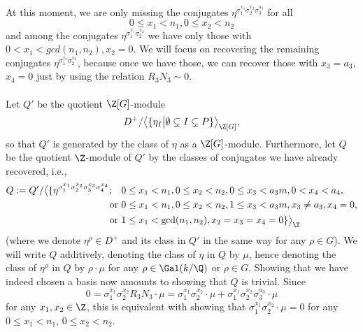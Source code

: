 \paragraph*{}
At this moment, we are only missing the conjugates $\eta^{\sigma_1^{x_1}\sigma_2^{x_2}\sigma_3^{a_3}}$ for all $$0\leq x_1<n_1, 0\leq x_2<n_2$$ 
and among the conjugates $\eta^{\sigma_1^{x_1}\sigma_2^{x_2}}$
we have only those with 
$0 < x_1 <gcd(n_1,n_2),  x_2 = 0$.
We will focus on recovering the remaining conjugates $\eta^{\sigma_1^{x_1}\sigma_2^{x_2}}$, 
because once we have those, we can recover those with $x_3=a_3$, $x_4=0$ just by using the relation $R_3N_3\sim 0$.

\paragraph*{}
Let $Q'$ be the quotient $\Z[G]$-module $$D^+/\big\langle \{\eta_I \big\vert \emptyset \subsetneq I \subsetneq P \}\big\rangle_{\Z[G]},$$
so that $Q'$ is generated by the class of $\eta$ as a $\Z[G]$-module. Furthermore, let $Q$ be the quotient $\Z$-module of $Q'$ by the classes of conjugates we have already recovered, i.e., %
\begin{align*}
Q:=Q'/\big\langle \{\eta^{\sigma_1^{x_1}\sigma_2^{x_2}\sigma_3^{x_3}\sigma_4^{x_4}}; \quad & 0\leq x_1< n_1, 0\leq x_2<n_2, 0\leq x_3<a_3m,0< x_4<a_4,\\
\text { or }& 0\leq x_1< n_1, 0\leq x_2<n_2, 1\leq x_3<a_3m, x_3\neq a_3, x_4=0,\\
\text { or }& 1\leq x_1<\gcd(n_1,n_2), x_2=x_3=x_4=0 \}\big\rangle_{\Z}
\end{align*}
(where we denote $\eta^{\rho}\in D^+$ and its class in $Q'$ in the same way for any $\rho\in G$).
We will write $Q$ additively, denoting the class of $\eta$ in $Q$ by $\mu$, hence denoting the class of $\eta^{\rho}$ in $Q$ by $\rho\cdot \mu$ for any $\rho\in\Gal(k/\Q)$ or $\rho\in G$.
Showing that we have indeed chosen a basis now amounts to showing that $Q$ is trivial. Since $$0=\sigma_1^{x_1}\sigma_2^{x_2}R_3N_3\cdot \mu=\sigma_1^{x_1}\sigma_2^{x_2}\cdot \mu+\sigma_1^{x_1}\sigma_2^{x_2}\sigma_3^{a_3}\cdot \mu$$
for any $x_1,x_2\in\Z$,
this is equivalent with showing that $\sigma_1^{x_1}\sigma_2^{x_2}\cdot \mu=0$ for any $0\leq x_1<n_1$, $0\leq x_2<n_2$.

